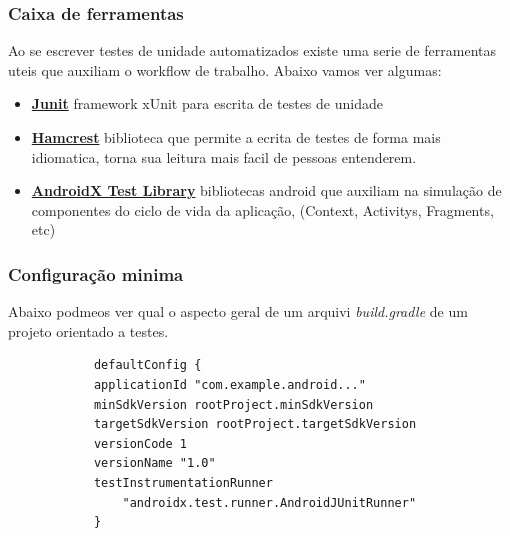 \documentclass{beamer}
\begin{document}
\begin{frame}
	\frametitle{Caixa de ferramentas}
	Ao se escrever testes de unidade automatizados existe uma serie de ferramentas uteis que auxiliam o workflow de trabalho. Abaixo vamos ver algumas:
	\newline 
	\begin{itemize}
		\item \href{https://junit.org/junit4/}{\textbf{Junit}} framework xUnit para escrita de testes de unidade
		\item \href{http://hamcrest.org/}{\textbf{Hamcrest}} biblioteca que permite a ecrita de testes de forma mais idiomatica, torna sua leitura mais facil de pessoas entenderem.
		\item \href{https://developer.android.com/training/testing/set-up-project}
		{\textbf{AndroidX Test Library}} bibliotecas android que auxiliam na simulação de componentes do ciclo de vida da aplicação, (Context, Activitys, Fragments, etc)
		

	\end{itemize}
	
\end{frame}

\begin{frame} [fragile]
	\frametitle{Configuração minima}
	Abaixo podmeos ver qual o aspecto geral de um arquivi \textit{build.gradle} de um projeto orientado a testes.
	\newline 
	\begin{example}
		\begin{lstlisting}
			defaultConfig {
			applicationId "com.example.android..."
			minSdkVersion rootProject.minSdkVersion
			targetSdkVersion rootProject.targetSdkVersion
			versionCode 1
			versionName "1.0"
			testInstrumentationRunner 
				"androidx.test.runner.AndroidJUnitRunner"
			}
			
		\end{lstlisting}
	\end{example}
	
\end{frame}
\end{document}
